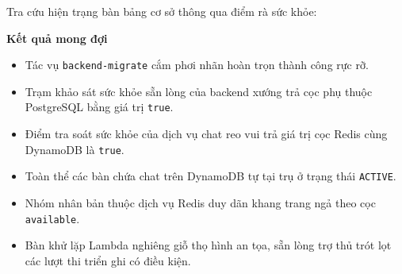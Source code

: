 \begin{Shaded}
\begin{Highlighting}[]
\end{Highlighting}
\end{Shaded}

Tra cứu hiện trạng bàn bảng cơ sở thông qua điểm rà sức khỏe:

\begin{Shaded}
\begin{Highlighting}[]
\OperatorTok{=}
\OperatorTok{=}
 
 
\end{Highlighting}
\end{Shaded}

\vspace{0.5em}\noindent\textbf{Kết quả mong đợi}\par

\begin{itemize}
\tightlist
\item
  Tác vụ \texttt{backend-\allowbreak{}migrate} cắm phơi nhãn hoàn trọn thành công rực
  rỡ.
\item
  Trạm khảo sát sức khỏe sẵn lòng của backend xướng trả cọc phụ thuộc
  PostgreSQL bằng giá trị \texttt{true}.
\item
  Điểm tra soát sức khỏe của dịch vụ chat reo vui trả giá trị cọc Redis
  cùng DynamoDB là \texttt{true}.
\item
  Toàn thể các bàn chứa chat trên DynamoDB tự tại trụ ở trạng thái
  \texttt{ACTIVE}.
\item
  Nhóm nhân bản thuộc dịch vụ Redis duy dãn khang trang ngả theo cọc
  \texttt{available}.
\item
  Bàn khử lặp Lambda nghiêng giỗ thọ hình an tọa, sẵn lòng trợ thủ trót
  lọt các lượt thi triển ghi có điều kiện.
\end{itemize}

